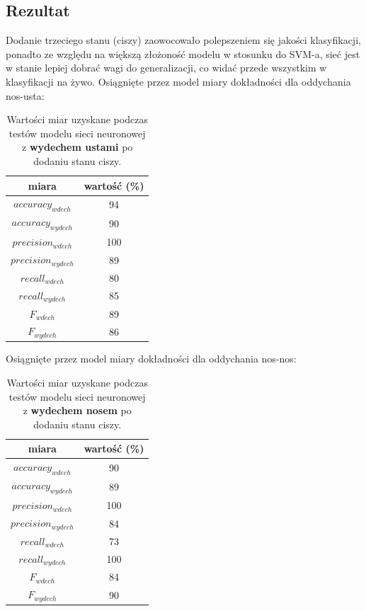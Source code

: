 \documentclass[polish]{article}
\begin{document}
\subsection{Rezultat}
Dodanie trzeciego stanu (ciszy) zaowocowało polepszeniem się jakości klasyfikacji, ponadto ze względu na większą złożoność modelu w stosunku do SVM-a, sieć jest w stanie lepiej dobrać wagi do generalizacji, co widać przede wszystkim w klasyfikacji na żywo. Osiągnięte przez model miary dokładności dla oddychania nos-usta:
\begin{table}[H]
	\caption{Wartości miar uzyskane podczas testów modelu sieci neuronowej z \textbf{wydechem ustami} po dodaniu stanu ciszy.}
	\begin{center}
		\begin{tabular}{c | c}
			miara & wartość (\%) \\
			\hline
			$accuracy_{wdech}$ & 94 \\
			$accuracy_{wydech}$ & 90 \\
			$precision_{wdech}$ & 100 \\
			$precision_{wydech}$ & 89 \\
			$recall_{wdech}$ & 80 \\
			$recall_{wydech}$ & 85 \\
			$F_{wdech}$ & 89 \\
			$F_{wydech}$ & 86
		\end{tabular}
	\end{center}
\end{table}
Osiągnięte przez model miary dokładności dla oddychania nos-nos:
\begin{table}[H]
	\caption{Wartości miar uzyskane podczas testów modelu sieci neuronowej z \textbf{wydechem nosem} po dodaniu stanu ciszy.}
	\begin{center}
		\begin{tabular}{c | c}
			miara & wartość (\%) \\
			\hline
			$accuracy_{wdech}$ & 90 \\
			$accuracy_{wydech}$ & 89 \\
			$precision_{wdech}$ & 100 \\
			$precision_{wydech}$ & 84 \\
			$recall_{wdech}$ & 73 \\
			$recall_{wydech}$ & 100 \\
			$F_{wdech}$ & 84 \\
			$F_{wydech}$ & 90
		\end{tabular}
	\end{center}
\end{table}
\end{document}
